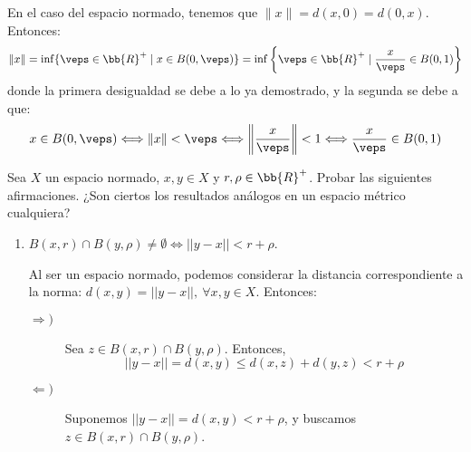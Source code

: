 \begin{ejercicio}
    En el caso del espacio normado, tenemos que $\|x\|=d(x,0)=d(0,x)$. Entonces:
    \begin{equation*}
        \|x\|=\inf \{\veps\in \bb{R}^+\mid x\in B(0,\veps)\}=\inf \left\{\veps\in \bb{R}^+\mid \frac{x}{\veps}\in B(0,1)\right\}
    \end{equation*}
    donde la primera desigualdad se debe a lo ya demostrado, y la segunda se debe a que:
    \begin{equation*}
        x\in B(0,\veps)\Longleftrightarrow \|x\|<\veps \Longleftrightarrow \left\|\frac{x}{\veps}\right\|<1 \Longleftrightarrow \frac{x}{\veps}\in B(0,1)
    \end{equation*}
\end{ejercicio}


\begin{ejercicio}\label{Ej:Tema2_2}
    Sea $X$ un espacio normado, $x,y\in X$ y $r,\rho\in \bb{R}^+$. Probar las siguientes afirmaciones. ¿Son ciertos los resultados análogos en un espacio métrico cualquiera?
    \begin{enumerate}
        \item $B(x,r)\cap B(y,\rho)\neq \emptyset \Longleftrightarrow ||y-x|| <r+\rho$. \label{Ej:Tema2_2.1}

        Al ser un espacio normado, podemos considerar la distancia correspondiente a la norma: $d(x,y)=||y-x||,~\forall x,y\in X$. Entonces:
        \begin{description}
            \item[$\Longrightarrow)$]
            Sea $z\in B(x,r)\cap B(y,\rho)$. Entonces,
            \begin{equation*}
                ||y-x|| = d(x,y) \leq d(x,z)+ d(y,z)<r + \rho
            \end{equation*}

            \item[$\Longleftarrow)$]
            Suponemos $||y-x||=d(x,y)<r+\rho$, y buscamos $z\in B(x,r)\cap B(y,\rho)$.\\

            \begin{comment}
            Supongamos en primer lugar que $d(x,z)+d(y,z)\geq r+\rho,~\forall z\in X$. Entonces, tomando en particular $z=y$, tenemos que
            \begin{equation*}
                d(x,z)+\cancelto{0}{d(y,z)}=d(x,y)\geq r+\rho \quad \text{Contradicción.}
            \end{equation*}


\end{comment}
\end{description}
\end{enumerate}
\end{ejercicio}
